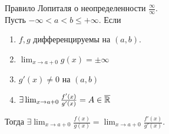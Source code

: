     \begin{theorem}{Правило Лопиталя о неопределенности $\frac{\infty}{\infty}$.}\\
        Пусть $-\infty < a < b \leq +\infty$. Если
        \begin{enumerate}
            \item $f, g$ дифференцируемы на $(a, b)$.
            \item $\lim_{x \to a+0} g(x) = \pm \infty$
            \item $g'(x) \neq 0$ на $(a, b)$
            \item $\exists \lim_{x \to a+0} \frac{f'(x)}{g'(x)} = A \in \overline{\mathbb{R}}$
        \end{enumerate}
        Тогда $\exists \lim_{x \to a+0} \frac{f(x)}{g(x)} = \lim_{x \to a+0} \frac{f'(x)}{g'(x)}$.
    \end{theorem}
    
